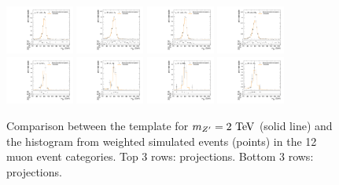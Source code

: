 \begin{figure}[htpb]
  \includegraphics[width=0.2\textwidth]{fig/2Dfit/templateVsReco_ZprToWW2000_r0_MJ_mu_HP_nobb_LDy.pdf}
  \includegraphics[width=0.2\textwidth]{fig/2Dfit/templateVsReco_ZprToWW2000_r0_MJ_mu_LP_nobb_LDy.pdf}
  \includegraphics[width=0.2\textwidth]{fig/2Dfit/templateVsReco_ZprToWW2000_r0_MJ_mu_HP_nobb_HDy.pdf}
  \includegraphics[width=0.2\textwidth]{fig/2Dfit/templateVsReco_ZprToWW2000_r0_MJ_mu_LP_nobb_HDy.pdf}\\
  \includegraphics[width=0.2\textwidth]{fig/2Dfit/templateVsReco_ZprToWW2000_r0_MJ_mu_HP_vbf_LDy.pdf}
  \includegraphics[width=0.2\textwidth]{fig/2Dfit/templateVsReco_ZprToWW2000_r0_MJ_mu_LP_vbf_LDy.pdf}
  \includegraphics[width=0.2\textwidth]{fig/2Dfit/templateVsReco_ZprToWW2000_r0_MJ_mu_HP_vbf_HDy.pdf}
  \includegraphics[width=0.2\textwidth]{fig/2Dfit/templateVsReco_ZprToWW2000_r0_MJ_mu_LP_vbf_HDy.pdf}\\
  \caption{
    Comparison between the \DY\ZprtoWW template for $m_{\Zpr}=2\unit{TeV}$ (solid line) and the histogram from weighted simulated events (points) in the 12 muon event categories.
    Top 3 rows: \MVV projections.
    Bottom 3 rows: \MJ projections.
  }
  \label{fig:1dtemplateVsReco_ZprToWW2000_Run2}
\end{figure}

